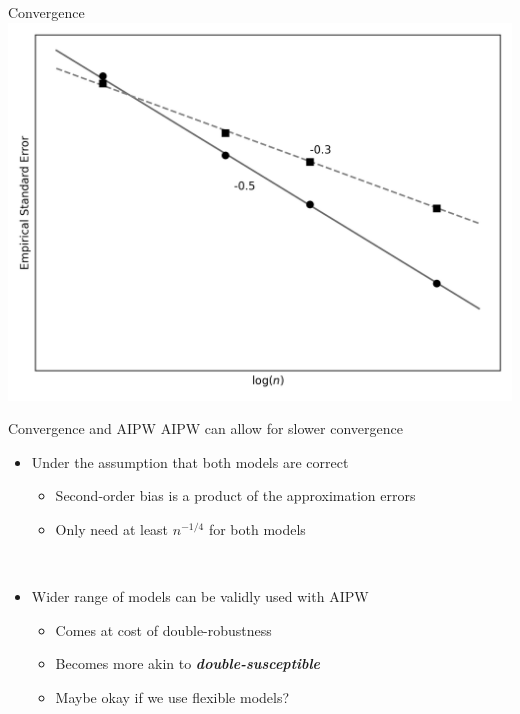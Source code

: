 \documentclass{beamer}
\begin{document}
\begin{frame}{Convergence}
	\centering
	\includegraphics[scale=0.54]{images/convergence.png}
\end{frame}

\begin{frame}{Convergence and AIPW}
	AIPW can allow for slower convergence
	\begin{itemize}
		\item Under the assumption that both models are correct
		\begin{itemize}
			\item Second-order bias is a product of the approximation errors
			\item Only need at least $n^{-1/4}$ for both models 
		\end{itemize}~\\
		\item Wider range of models can be validly used with AIPW
		\begin{itemize}
			\item Comes at cost of double-robustness
			\item Becomes more akin to \textbf{\textit{double-susceptible}}
			\item Maybe okay if we use flexible models?
		\end{itemize}
	\end{itemize}
\end{frame}
\end{document}
